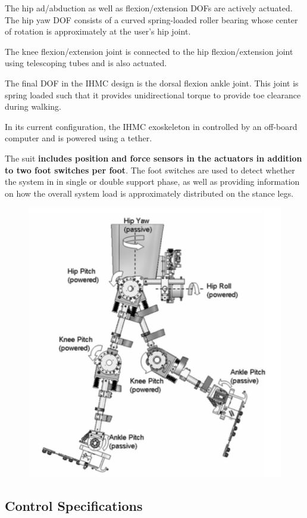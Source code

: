  The hip ad/abduction as well as flexion/extension DOFs are actively actuated.  The hip yaw DOF consists of a curved spring-loaded roller bearing whose center of rotation is approximately at the user's hip joint.
 
 The knee flexion/extension joint is connected to the hip flexion/extension joint using telescoping tubes and is also actuated.
 
 The final DOF in the IHMC design is the dorsal flexion ankle joint.  This joint is spring loaded such that it provides unidirectional torque to provide toe clearance during walking.
 
 In its current configuration, the IHMC exoskeleton in controlled by an off-board computer and is powered using a tether. 
 
 The suit {\bf includes position and force sensors in the actuators in addition to two foot switches per foot}.  The foot switches are used to detect whether the system in in single or double support phase, as well as providing information on how the overall system load is approximately distributed on the stance legs.
 
 
 \begin{figure}[thpb]
\centering
\includegraphics[width=3.in]{exos/figs/ihmc/ihmcSys}
  \caption{}
  \vspace{-0.2in}
 \label{fig:IHMCSYS}   
 \end{figure}
 
 
 \subsection{Control Specifications}
 
